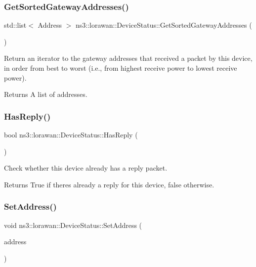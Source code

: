 \subsubsection{\texorpdfstring{Get\+Sorted\+Gateway\+Addresses()}{GetSortedGatewayAddresses()}}
{\footnotesize\ttfamily std\+::list$<$ Address $>$ ns3\+::lorawan\+::\+Device\+Status\+::\+Get\+Sorted\+Gateway\+Addresses (\begin{DoxyParamCaption}\item[{void}]{ }\end{DoxyParamCaption})}

Return an iterator to the gateway addresses that received a packet by this device, in order from best to worst (i.\+e., from highest receive power to lowest receive power).

\begin{DoxyReturn}{Returns}
A list of addresses. 
\end{DoxyReturn}
\mbox{\label{classns3_1_1lorawan_1_1DeviceStatus_a1a713e0523cef431cd3194aa27bd6f57}} 
\subsubsection{\texorpdfstring{Has\+Reply()}{HasReply()}}
{\footnotesize\ttfamily bool ns3\+::lorawan\+::\+Device\+Status\+::\+Has\+Reply (\begin{DoxyParamCaption}\item[{void}]{ }\end{DoxyParamCaption})}

Check whether this device already has a reply packet.

\begin{DoxyReturn}{Returns}
True if there\textquotesingle{}s already a reply for this device, false otherwise. 
\end{DoxyReturn}
\mbox{\label{classns3_1_1lorawan_1_1DeviceStatus_a690f9059f8cc8b6ce516da4d670f4b94}} 
\subsubsection{\texorpdfstring{Set\+Address()}{SetAddress()}}
{\footnotesize\ttfamily void ns3\+::lorawan\+::\+Device\+Status\+::\+Set\+Address (\begin{DoxyParamCaption}\item[{\hyperlink{classns3_1_1lorawan_1_1LoraDeviceAddress}{Lora\+Device\+Address}}]{address }\end{DoxyParamCaption})}

